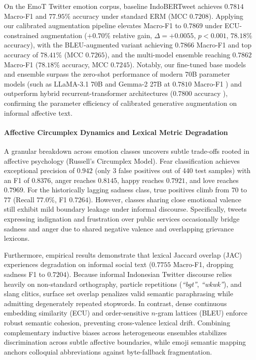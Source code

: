 \documentclass{ieeeaccess}
\begin{document}
On the EmoT Twitter emotion corpus, baseline IndoBERTweet achieves $0.7814$ Macro-F1 and $77.95\%$ accuracy under standard ERM (MCC $0.7208$). Applying our calibrated augmentation pipeline elevates Macro-F1 to \textbf{$0.7869$} under ECU-constrained augmentation ($+0.70\%$ relative gain, $\Delta = +0.0055$, $p < 0.001$, $78.18\%$ accuracy), with the BLEU-augmented variant achieving \textbf{$0.7866$} Macro-F1 and top accuracy of \textbf{$78.41\%$} (MCC \textbf{$0.7265$}), and the multi-model ensemble reaching \textbf{$0.7862$} Macro-F1 ($78.18\%$ accuracy, MCC $0.7245$). Notably, our fine-tuned base models and ensemble surpass the zero-shot performance of modern 70B parameter models (such as LLaMA-3.1 70B and Gemma-2 27B at $0.7810$ Macro-F1 \cite{nasution2025benchmarking}) and outperform hybrid recurrent-transformer architectures ($0.7800$ accuracy \cite{ahmadian2024hybrid}), confirming the parameter efficiency of calibrated generative augmentation on informal affective text. 

\paragraph{Affective Circumplex Dynamics and Lexical Metric Degradation}
A granular breakdown across emotion classes uncovers subtle trade-offs rooted in affective psychology (Russell's Circumplex Model). Fear classification achieves exceptional precision of \textbf{$0.942$} (only 3 false positives out of 440 test samples) with an F1 of \textbf{$0.8376$}, anger reaches \textbf{$0.8145$}, happy reaches \textbf{$0.7921$}, and love reaches \textbf{$0.7969$}. For the historically lagging sadness class, true positives climb from $70$ to \textbf{$77$} (Recall $77.0\%$, F1 \textbf{$0.7264$}). However, classes sharing close emotional valence still exhibit mild boundary leakage under informal discourse. Specifically, tweets expressing indignation and frustration over public services occasionally bridge sadness and anger due to shared negative valence and overlapping grievance lexicons.

Furthermore, empirical results demonstrate that lexical Jaccard overlap (JAC) experiences degradation on informal social text ($0.7755$ Macro-F1, dropping sadness F1 to $0.7204$). Because informal Indonesian Twitter discourse relies heavily on non-standard orthography, particle repetitions (\textit{``bgt''}, \textit{``wkwk''}), and slang clitics, surface set overlap penalizes valid semantic paraphrasing while admitting degenerately repeated stopwords. In contrast, dense continuous embedding similarity (ECU) and order-sensitive $n$-gram lattices (BLEU) enforce robust semantic cohesion, preventing cross-valence lexical drift. Combining complementary inductive biases across heterogeneous ensembles stabilizes discrimination across subtle affective boundaries, while emoji semantic mapping anchors colloquial abbreviations against byte-fallback fragmentation.
\end{document}
